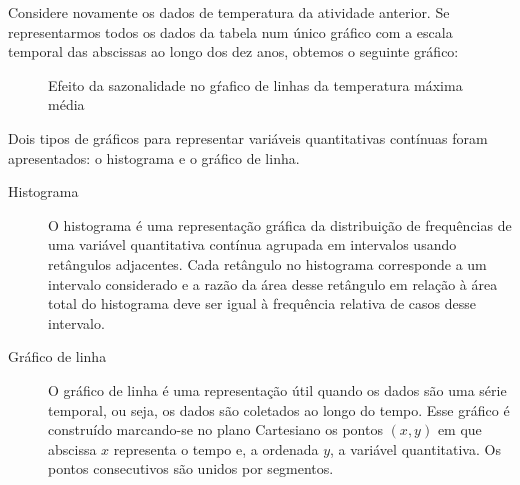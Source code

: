 Considere novamente os dados de temperatura da atividade anterior. Se representarmos todos os dados da tabela num único gráfico com a escala temporal das abscissas ao longo dos dez anos, obtemos o seguinte gráfico:

\begin{figure}[H]
\centering
\capstart

\noindent{}
\caption{Efeito da sazonalidade no gŕafico de linhas da temperatura máxima média}\label{\detokenize{PE103-3:fig-linhas-sazonalidade}}\label{\detokenize{PE103-3:id4}}\end{figure}


\arrange{ }
\label{\detokenize{PE103-4:cap-organizando-as-ideias2}}\label{\detokenize{PE103-4:organizando-as-ideias}}\label{\detokenize{PE103-4::doc}}
Dois tipos de gráficos para representar variáveis quantitativas contínuas foram apresentados: o histograma e o gráfico de linha.
\begin{description}
\item[{Histograma}] \leavevmode{}\label{\detokenize{PE103-4:term-histograma}}
O histograma é uma representação gráfica da distribuição de frequências de uma variável quantitativa contínua agrupada em intervalos usando retângulos adjacentes. Cada retângulo no histograma corresponde a um intervalo considerado e a razão da área desse retângulo em relação à área total do histograma deve ser igual à frequência relativa de casos desse intervalo.

\end{description}
\begin{description}
\item[{Gráfico de linha}] \leavevmode{}\label{\detokenize{PE103-4:term-grafico-de-linha}}
O gráfico de linha é uma representação útil quando os dados são uma série temporal, ou seja, os dados são coletados ao longo do tempo. Esse gráfico é construído marcando-se no plano Cartesiano os pontos \((x,y)\) em que abscissa \(x\) representa o tempo e, a ordenada \(y\), a variável quantitativa. Os pontos consecutivos são unidos por segmentos.

\end{description}

